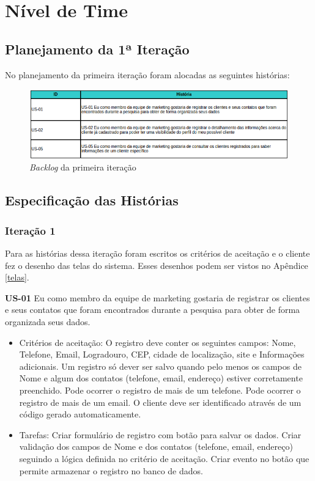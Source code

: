 \chapter[Nível de Time]{Nível de Time}

\section{Planejamento da 1ª Iteração}

No planejamento da primeira iteração foram alocadas as seguintes histórias:

\begin{figure}[!htb]
\centering
\includegraphics[scale=0.8]{figuras/backlog_iteracao.png}
\caption{\textit{Backlog} da primeira iteração}
\label{fig:backlog}
\end{figure}

\section{Especificação das Histórias}

\subsection{Iteração 1}
Para as histórias dessa iteração foram escritos os critérios de aceitação e o cliente fez o desenho das telas do sistema. Esses desenhos
podem ser vistos no Apêndice \ref{telas}.

\textbf{US-01} Eu como membro da equipe de marketing gostaria de registrar os clientes e seus contatos que foram encontrados durante a pesquisa para obter de forma organizada seus dados.

\begin{itemize}
 \item Critérios de aceitação:
\subitem O registro deve conter os seguintes campos: Nome, Telefone, Email, Logradouro, CEP, cidade de localização, site e Informações adicionais.
\subitem Um registro só dever ser salvo quando pelo menos os campos de Nome e algum dos contatos (telefone, email, endereço) estiver corretamente preenchido.
\subitem Pode ocorrer o registro de mais de um telefone.
\subitem Pode ocorrer o registro de mais de um email.
\subitem O cliente deve ser identificado através de um código gerado automaticamente.

\item Tarefas:
\subitem Criar formulário de registro com botão para salvar os dados.
\subitem Criar validação dos campos de Nome e dos contatos (telefone, email, endereço) seguindo a lógica definida no critério de aceitação.
\subitem Criar evento no botão que permite armazenar o registro no banco de dados.
\end{itemize}


